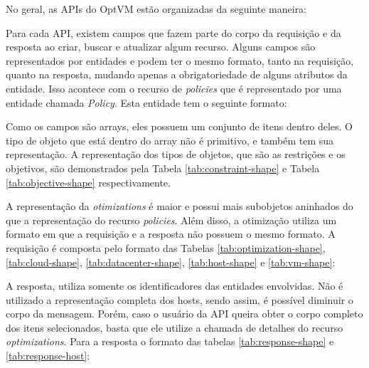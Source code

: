 No geral, as APIs do OptVM estão organizadas da seguinte maneira:





Para cada API, existem campos que fazem parte do corpo da requisição e da resposta
ao criar, buscar e atualizar algum recurso. Alguns campos são representados por entidades e 
podem ter o mesmo formato, tanto na requisição, quanto na resposta, mudando apenas
a obrigatoriedade de alguns atributos da entidade. Isso acontece
com o recurso de \textit{policies} que é representado por uma entidade chamada \textit{Policy}.
Esta entidade tem o seguinte formato:



Como os campos são arrays, eles possuem um conjunto de itens dentro deles. O tipo
de objeto que está dentro do array não é primitivo, e também tem sua representação.
A representação dos tipos de objetos, que são as restrições e os objetivos, são demonstrados
pela Tabela \ref{tab:constraint-shape} e Tabela \ref{tab:objective-shape} respectivamente.




A representação da \textit{otimizations} é maior e possui mais subobjetos aninhados
do que a representação do recurso \textit{policies}. Além disso, a otimização utiliza 
um formato em que a requisição e a resposta não possuem o mesmo formato. A requisição
é composta pelo formato das Tabelas \ref{tab:optimization-shape}, \ref{tab:cloud-shape},
\ref{tab:datacenter-shape}, \ref{tab:host-shape} e \ref{tab:vm-shape}:







A resposta, utiliza somente os identificadores das entidades envolvidas. Não
é utilizado a representação completa dos hosts, sendo assim, é possível
diminuir o corpo da mensagem. Porém, caso o usuário da API queira obter 
o corpo completo dos itens selecionados, basta que ele utilize a chamada de 
detalhes do recurso \textit{optimizations}. Para a resposta o formato das
tabelas \ref{tab:response-shape} e \ref{tab:response-host}:




